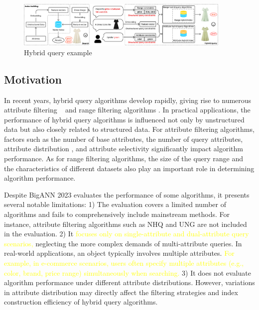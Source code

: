 \documentclass[sigconf, nonacm]{acmart}
\begin{document}
	\begin{figure}
		\centering
		\setlength{\abovecaptionskip}{0.1cm}
		\setlength{\belowcaptionskip}{-0.5cm}
		\includegraphics[width=0.92\textwidth]{figures/hybrid ANNS.pdf}
		\caption{Hybrid query example}
		
		\label{fig:hybrid ANNS}
	\end{figure}
	\subsection{Motivation}
	
	In recent years, hybrid query algorithms develop rapidly, giving rise to numerous attribute filtering ~\cite{NHQ,diskann} and range filtering algorithms \cite{serf,iRangeGraph}. In practical applications, the performance of hybrid query algorithms is influenced not only by unstructured data but also closely related to structured data. For attribute filtering algorithms, factors such as the number of base attributes, the number of query attributes, attribute distribution \cite{UNG}, and attribute selectivity \cite{ACORN} significantly impact algorithm performance. As for range filtering algorithms, the size of the query range and the characteristics of different datasets also play an important role in determining algorithm performance.
	
	Despite BigANN 2023 \cite{bigann2023} evaluates the performance of some algorithms, it presents several notable limitations:
	1) The evaluation covers a limited number of algorithms and fails to comprehensively include mainstream methods. For instance, attribute filtering algorithms such as NHQ and UNG are not included in the evaluation. 2) It \textcolor{yellow}{focuses only on single-attribute and dual-attribute query scenarios,} neglecting the more complex demands of multi-attribute queries. In real-world applications, an object typically involves multiple attributes.\textcolor{yellow}{ For example, in e-commerce scenarios, users often specify multiple attributes (e.g., color, brand, price range) simultaneously when searching.}
	3) It does not evaluate algorithm performance under different attribute distributions. However, variations in attribute distribution may directly affect the filtering strategies and index construction efficiency of hybrid query algorithms.
	
\end{document}
